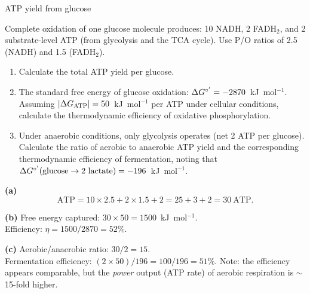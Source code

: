\documentclass[12pt, a4paper, oneside]{report}
\begin{document}
\begin{problem}{\enspace{}
  \enspace{}\enspace
  ATP yield from glucose}

  Complete oxidation of one glucose molecule produces:
  10 NADH, 2 FADH$_2$, and 2 substrate-level ATP (from glycolysis
  and the TCA cycle). Use P/O ratios of 2.5 (NADH) and 1.5 (FADH$_2$).

  \begin{enumerate}
    \item Calculate the total ATP yield per glucose.
    \item The standard free energy of glucose oxidation:
          $\Delta G^{\circ'} = -2870$~kJ~mol$^{-1}$.
          Assuming $|\Delta G_\text{ATP}| = 50$~kJ~mol$^{-1}$ per ATP
          under cellular conditions, calculate the thermodynamic
          efficiency of oxidative phosphorylation.
    \item Under anaerobic conditions, only glycolysis operates
          (net 2 ATP per glucose). Calculate the ratio of aerobic
          to anaerobic ATP yield and the corresponding
          thermodynamic efficiency of fermentation, noting
          that $\Delta G^{\circ'}(\text{glucose} \to 2 \text{ lactate})
          = -196$~kJ~mol$^{-1}$.
  \end{enumerate}
\end{problem}

\begin{solution}
  \textbf{(a)}
  \[
    \text{ATP} = 10 \times 2.5 + 2 \times 1.5 + 2 = 25 + 3 + 2 = 30~\text{ATP}.
  \]

  \textbf{(b)} Free energy captured:
  $30 \times 50 = 1500$~kJ~mol$^{-1}$.\\
  Efficiency: $\eta = 1500/2870 = 52\%$.

  \textbf{(c)} Aerobic/anaerobic ratio: $30/2 = 15$.\\
  Fermentation efficiency: $(2 \times 50)/196 = 100/196 = 51\%$.
  Note: the efficiency appears comparable, but the \emph{power} output
  (ATP rate) of aerobic respiration is $\sim$15-fold higher.
\end{solution}
\end{document}
